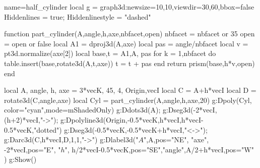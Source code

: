 \documentclass[border=5pt]{standalone}
\begin{document}
\begin{luadraw}{name=half_cylinder}
local g = graph3d:new{size={10,10},viewdir={30,60},bbox=false}
Hiddenlines = true; Hiddenlinestyle = "dashed"

function part_cylinder(A,angle,h,axe,nbfacet,open)
    nbfacet = nbfacet or 35
    open = open or false
    local A1 = dproj3d(A,axe)
    local pas = angle/nbfacet
    local v = pt3d.normalize(axe[2])
    local base,t = {A1,A}, pas
    for k = 1,nbfacet do
        table.insert(base,rotate3d(A,t,axe))
        t = t + pas
    end
    return prism(base,h*v,open)
end

local A, angle, h, axe = 3*vecK, 45, 4, {Origin,vecI}
local C = A+h*vecI
local D = rotate3d(C,angle,axe)
local Cyl = part_cylinder(A,angle,h,axe,20)
g:Dpoly(Cyl, {color="cyan",mode=mShadedOnly})
g:Ddots3d(A); g:Dseg3d({-2*vecI,(h+2)*vecI},"->"); g:Dpolyline3d({{Origin,-0.5*vecK},{h*vecI,h*vecI-0.5*vecK}},"dotted")
g:Dseg3d({-0.5*vecK,-0.5*vecK+h*vecI},"<->"); g:Darc3d(C,h*vecI,D,1,1,"->")
g:Dlabel3d("$A$",A,{pos="NE"}, "axe", -2*vecI,{pos="E"}, 
"$h$", h/2*vecI-0.5*vecK,{pos="SE"},"angle",A/2+h*vecI,{pos="W"} )
 g:Show()
\end{luadraw}
\end{document}
